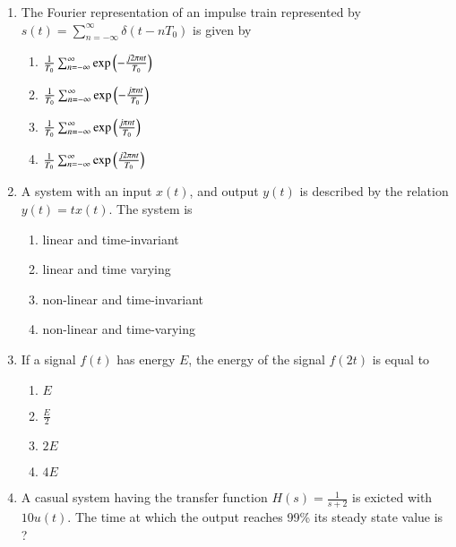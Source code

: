 \renewcommand{\theequation}{\theenumi}
\begin{enumerate}[label=\arabic*.,ref=\theenumi]

\item The Fourier representation of an impulse train represented by $s(t) = \sum_{n=-\infty}^{\infty}\delta(t-nT_0)$ is given by
\begin{enumerate}[label=(\alph*)]
\setlength\itemsep{0.5em}
    \item $\frac{1}{T_0}\sum_{n=-\infty}^{\infty}\exp\left(-\frac{j2\pi nt}{T_0}\right)$
    \item $\frac{1}{T_0}\sum_{n=-\infty}^{\infty}\exp\left(-\frac{j\pi nt}{T_0}\right)$
    \item $\frac{1}{T_0}\sum_{n=-\infty}^{\infty}\exp\left(\frac{j\pi nt}{T_0}\right)$
    \item $\frac{1}{T_0}\sum_{n=-\infty}^{\infty}\exp\left(\frac{j2\pi nt}{T_0}\right)$
\end{enumerate}
\solution

%
\item A system with an input $x(t)$, and output $y(t)$ is described by the relation $y(t) = tx(t)$. The system is
\begin{enumerate}
    \item  linear and time-invariant  
    \item linear and time varying   
  \item non-linear and time-invariant  
  \item non-linear and time-varying 
\end{enumerate}

%

\item If a signal $f(t)$ has energy $E$, the energy of the signal $f(2t)$ is equal to 
\begin{enumerate}[label=\Alph*)]
    \item $E$
    \item $\frac{E}{2}$
    \item $2E$
    \item $4E$
\end{enumerate}
\solution

%


\item A casual system having the transfer function $H(s)=\frac{1}{s+2}$ is exicted with $10u(t)$. The time at which the output reaches 99\% its steady state value is ?
\\
\solution




\end{enumerate}
